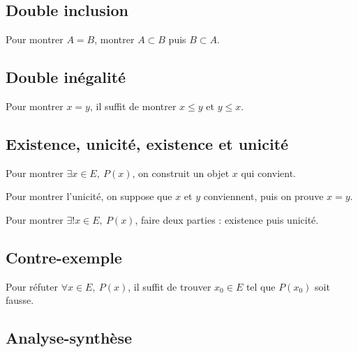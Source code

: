 \documentclass[11pt,a4paper]{article}
\begin{document}
\subsection{Double inclusion}

\begin{methodebox}
Pour montrer \(A=B\), montrer \(A\subset B\) puis \(B\subset A\).
\end{methodebox}

\subsection{Double inégalité}

\begin{methodebox}
Pour montrer \(x=y\), il suffit de montrer \(x\leq y\) et \(y\leq x\).
\end{methodebox}

\subsection{Existence, unicité, existence et unicité}

\begin{methodebox}[existence]
Pour montrer \(\exists x\in E,\ P(x)\), on construit un objet \(x\) qui convient.
\end{methodebox}

\begin{methodebox}[unicité]
Pour montrer l'unicité, on suppose que \(x\) et \(y\) conviennent, puis on prouve \(x=y\).
\end{methodebox}

\begin{methodebox}
Pour montrer \(\exists!x\in E,\ P(x)\), faire deux parties : existence puis unicité.
\end{methodebox}

\subsection{Contre-exemple}

\begin{methodebox}
Pour réfuter \(\forall x\in E,\ P(x)\), il suffit de trouver \(x_0\in E\) tel que \(P(x_0)\) soit fausse.
\end{methodebox}

\subsection{Analyse-synthèse}
\end{document}
